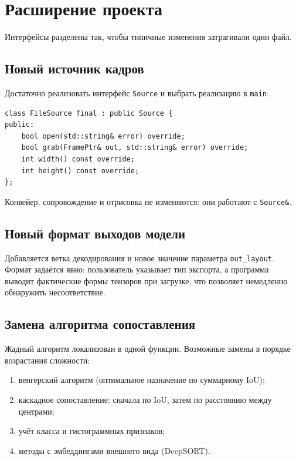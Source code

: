 \documentclass[11pt,a4paper]{article}
\theoremstyle{definition}
\theoremstyle{remark}
\begin{document}
\section{Расширение проекта}
\label{sec:extend}

Интерфейсы разделены так, чтобы типичные изменения затрагивали один файл.

\subsection{Новый источник кадров}

Достаточно реализовать интерфейс \texttt{Source} и выбрать реализацию в
\texttt{main}:

\begin{lstlisting}
class FileSource final : public Source {
public:
    bool open(std::string& error) override;
    bool grab(FramePtr& out, std::string& error) override;
    int width() const override;
    int height() const override;
};
\end{lstlisting}

Конвейер, сопровождение и отрисовка не изменяются: они работают с
\texttt{Source\&}.

\subsection{Новый формат выходов модели}

Добавляется ветка декодирования и новое значение параметра
\texttt{out\_layout}. Формат задаётся явно: пользователь указывает тип
экспорта, а программа выводит фактические формы тензоров при загрузке, что
позволяет немедленно обнаружить несоответствие.

\subsection{Замена алгоритма сопоставления}

Жадный алгоритм локализован в одной функции. Возможные замены в порядке
возрастания сложности:

\begin{enumerate}
  \item венгерский алгоритм (оптимальное назначение по суммарному
        $\mathrm{IoU}$);
  \item каскадное сопоставление: сначала по $\mathrm{IoU}$, затем по
        расстоянию между центрами;
  \item учёт класса и гистограммных признаков;
  \item методы с эмбеддингами внешнего вида (DeepSORT).
\end{enumerate}
\end{document}
